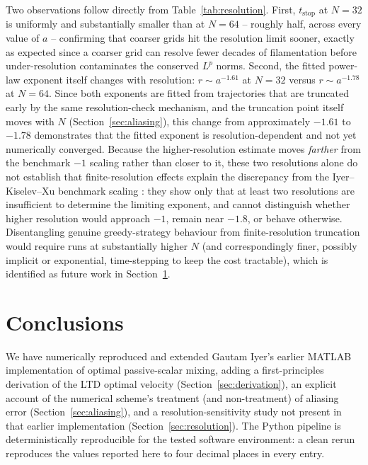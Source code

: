 \documentclass[12pt,a4paper]{article}
\theoremstyle{definition}
\theoremstyle{plain}
\begin{document}
Two observations follow directly from Table~\ref{tab:resolution}. First,
$t_{\text{stop}}$ at $N=32$ is uniformly and substantially smaller than at
$N=64$ -- roughly half, across every value of $a$ -- confirming that coarser
grids hit the resolution limit sooner, exactly as expected since a coarser
grid can resolve fewer decades of filamentation before under-resolution
contaminates the conserved $L^p$ norms. Second, the fitted power-law
exponent itself changes with resolution: $r\sim a^{-1.61}$ at $N=32$
versus $r\sim a^{-1.78}$ at $N=64$. Since both exponents are fitted
from trajectories that are truncated early by the same resolution-check
mechanism, and the truncation point itself moves with $N$
(Section~\ref{sec:aliasing}), this change from approximately $-1.61$ to
$-1.78$ demonstrates that the fitted exponent is resolution-dependent and
not yet numerically converged. Because the higher-resolution estimate
moves \emph{farther} from the benchmark $-1$ scaling rather than closer to
it, these two resolutions alone do not establish that finite-resolution
effects explain the discrepancy from the Iyer--Kiselev--Xu benchmark
scaling \cite{Iyer2014}: they show only that at least two resolutions are
insufficient to determine the limiting exponent, and cannot distinguish
whether higher resolution would approach $-1$, remain near $-1.8$, or
behave otherwise. Disentangling genuine greedy-strategy behaviour from
finite-resolution truncation would require runs at substantially higher
$N$ (and correspondingly finer, possibly implicit or exponential,
time-stepping to keep the cost tractable), which is identified as future
work in Section~\ref{sec:conc}.

\section{Conclusions}
\label{sec:conc}

We have numerically reproduced and extended Gautam Iyer's earlier MATLAB
implementation of optimal passive-scalar mixing, adding a first-principles
derivation of the LTD optimal velocity (Section~\ref{sec:derivation}), an
explicit account of the numerical scheme's treatment (and non-treatment)
of aliasing error (Section~\ref{sec:aliasing}), and a resolution-sensitivity
study not present in that earlier implementation (Section~\ref{sec:resolution}).
The Python pipeline is deterministically reproducible for the tested
software environment: a clean rerun reproduces the values reported here to
four decimal places in every entry.
\end{document}
